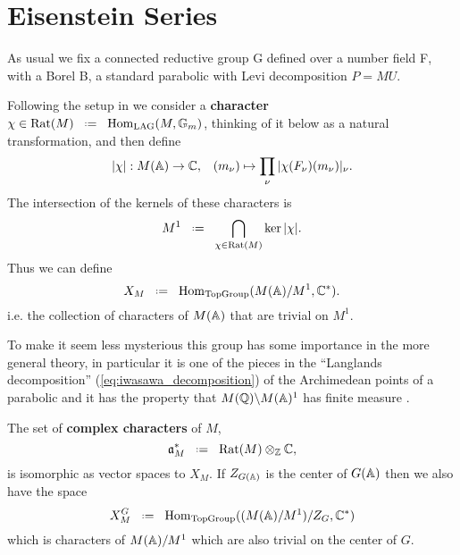 \section{Eisenstein Series}
As usual we fix a connected reductive group G defined over a number field F, with a Borel B, a standard parabolic with Levi decomposition \(P = MU\). 

Following the setup in \cite[I.1.4]{moeglinSpectralDecompositionEisenstein1995} we consider a \textbf{character} \(\chi\in \mathrm{Rat}(M) \defeq \Hom_{\mathrm{LAG}}(M, \mathbb{G}_m)\), thinking of it below as a natural transformation, and then define 
\[|\chi|: M(\A)\to \C , \;\;\; (m_\nu)\mapsto \prod_\nu|\chi(F_\nu)(m_\nu)|_\nu.\]
The intersection of the kernels of these characters is 
\[M^1 \defeq \bigcap_{\chi\in \mathrm{Rat}(M)}\ker |\chi|.\]
Thus we can define
\[X_M \defeq \Hom_{\textrm{TopGroup}}(M(\A)/M^1, \C^*) .\]
i.e. the collection of characters of \(M(\A)\) that are trivial on \(M^1\).
\begin{remark}
    To make it seem less mysterious this group has some importance in the more general theory, in particular it is one of the pieces in the ``Langlands decomposition'' (\ref{eq:iwasawa_decomposition}) of the Archimedean points of a parabolic and it has the property that \(M(\Q)\backslash M(\A)^1\) has finite measure \cite[4.9]{getzIntroductionAutomorphicRepresentations2024}.
\end{remark}
The set of \textbf{complex characters} of \(M\),
\[\mathfrak{a}_M^* \defeq \mathrm{Rat}(M)\tensor_\Z \C,\]
is isomorphic as \C vector spaces to \(X_M\). If \(Z_{G(\A)}\) is the center of \(G(\A)\) then we also have the space 
\[X_M^G \defeq \Hom_{\textrm{TopGroup}}((M(\A)/M^1)/Z_G, \C^*)\]
which is characters of \(M(\A)/M^1\) which are also trivial on the center of \(G\).

